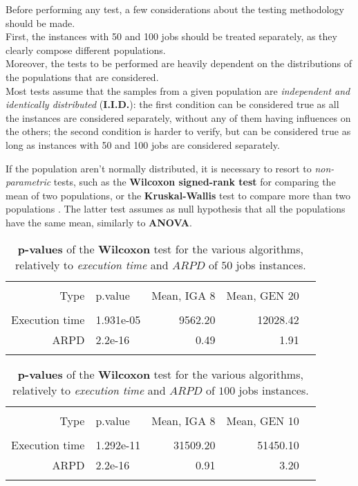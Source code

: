 \documentclass[
12pt,
a4paper,
oneside,
headinclude,
footinclude]{article}
\theoremstyle{definition} %
\begin{document}
Before performing any test, a few considerations about the testing methodology should be made.\\
First, the instances with 50 and 100 jobs should  be treated separately, as they clearly compose different populations.\\
Moreover, the tests to be performed are heavily dependent on the distributions of the populations that are considered.\\
Most tests assume that the samples from a given population are \textit{independent and identically distributed} (\textbf{I.I.D.}): the first condition can be considered true as all the instances are considered separately, without any of them having influences on the others; the second condition is harder to verify, but can be considered true as long as instances with 50 and 100 jobs are considered separately.

If the population aren't normally distributed, it is necessary to resort to \textit{non-parametric} tests, such as the \textbf{Wilcoxon signed-rank test} \cite{wilcoxon1945individual} for comparing the mean of two populations, or the \textbf{Kruskal-Wallis} test to compare more than two populations \cite{kruskal1952use}. The latter test assumes as null hypothesis that all the populations have the same mean, similarly to \textbf{ANOVA}.

\begin{table}[H]
    \centering
    \begin{tabular}{rlrrr}
        \hline
        \\[-1.5ex]
        Type & p.value & Mean, IGA 8 & Mean, GEN 20 \\ 
        \hline
        \\[-1.5ex]
        Execution time & 1.931e-05 & 9562.20 & 12028.42 \\ 
        ARPD & 2.2e-16 & 0.49 & 1.91 \\ 
        \\[-1.6ex]
        \hline
    \end{tabular}
    \caption{\label{tab:p-50}\textbf{p-values} of the \textbf{Wilcoxon} test for the various algorithms, relatively to \textit{execution time} and $ARPD$ of $50$ jobs instances.}
\end{table}

\begin{table}[H]
    \centering
    \begin{tabular}{rlrrr}
        \hline
        \\[-1.5ex]
        Type & p.value & Mean, IGA 8 & Mean, GEN 10 \\ 
        \hline
        \\[-1.5ex]
        Execution time & 1.292e-11 & 31509.20 & 51450.10 \\ 
        ARPD & 2.2e-16 & 0.91 & 3.20 \\ 
        \\[-1.6ex]
        \hline
    \end{tabular}
    \caption{\label{tab:p-100}\textbf{p-values} of the \textbf{Wilcoxon} test for the various algorithms, relatively to \textit{execution time} and $ARPD$ of $100$ jobs instances.}
\end{table}
\end{document}
